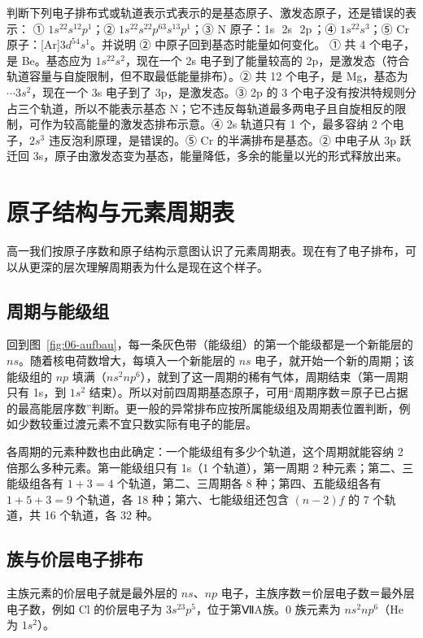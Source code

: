 \begin{liti}[综合]
判断下列电子排布式或轨道表示式表示的是基态原子、激发态原子，还是错误的表示：
① $1s^22s^12p^1$；② $1s^22s^22p^63s^13p^1$；③ N 原子：1s\,\ 2s\,\ 2p\,；④ $1s^22s^3$；⑤ Cr 原子：[Ar]$3d^54s^1$。并说明 ② 中原子回到基态时能量如何变化。
\tcblower
\jie ① 共 4 个电子，是 Be。基态应为 $1s^22s^2$，现在一个 2s 电子到了能量较高的 2p，是激发态（符合轨道容量与自旋限制，但不取最低能量排布）。② 共 12 个电子，是 Mg，基态为 $\cdots3s^2$，现在一个 3s 电子到了 3p，是激发态。③ 2p 的 3 个电子没有按洪特规则分占三个轨道，所以不能表示基态 N；它不违反每轨道最多两电子且自旋相反的限制，可作为较高能量的激发态排布示意。④ 2s 轨道只有 1 个，最多容纳 2 个电子，$2s^3$ 违反泡利原理，是错误的。⑤ Cr 的半满排布是基态。② 中电子从 3p 跃迁回 3s，原子由激发态变为基态，能量降低，多余的能量以光的形式释放出来。
\end{liti}

\section{原子结构与元素周期表}
高一我们按原子序数和原子结构示意图认识了元素周期表。现在有了电子排布，可以从更深的层次理解周期表为什么是现在这个样子。

\subsection{周期与能级组}
回到图~\ref{fig:06-aufbau}，每一条灰色带（能级组）的第一个能级都是一个新能层的 $ns$。随着核电荷数增大，每填入一个新能层的 $ns$ 电子，就开始一个新的周期；该能级组的 $np$ 填满（$ns^2np^6$），就到了这一周期的稀有气体，周期结束（第一周期只有 1s，到 $1s^2$ 结束）。所以对前四周期基态原子，可用“周期序数＝原子已占据的最高能层序数”判断。更一般的异常排布应按所属能级组及周期表位置判断，例如少数较重过渡元素不宜只数实际有电子的能层。

各周期的元素种数也由此确定：一个能级组有多少个轨道，这个周期就能容纳 2 倍那么多种元素。第一能级组只有 1s（1 个轨道），第一周期 2 种元素；第二、三能级组各有 $1+3=4$ 个轨道，第二、三周期各 8 种；第四、五能级组各有 $1+5+3=9$ 个轨道，各 18 种；第六、七能级组还包含 $(n-2)f$ 的 7 个轨道，共 16 个轨道，各 32 种。

\subsection{族与价层电子排布}
主族元素的价层电子就是最外层的 $ns$、$np$ 电子，主族序数＝价层电子数＝最外层电子数，例如 Cl 的价层电子为 $3s^23p^5$，位于第ⅦA族。0 族元素为 $ns^2np^6$（He 为 $1s^2$）。

